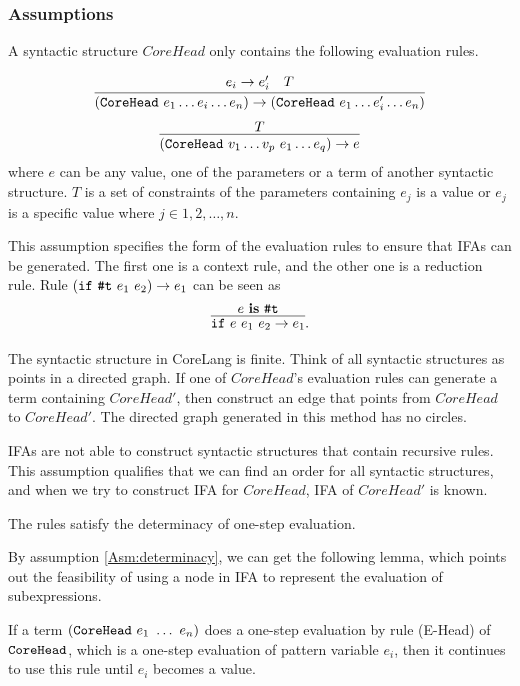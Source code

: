 \subsubsection{Assumptions}

\begin{Asm}
\label{Asm:rules}
A syntactic structure $CoreHead$ only contains the following evaluation rules.

\[
\infer
{(\m{CoreHead}~e_1 \ldots e_i \ldots e_n) \to (\m{CoreHead}~e_1 \ldots e_i' \ldots e_n)}{e_i \to e_i'\quad T}
\]
\[
\infer{(\m{CoreHead}~v_1 \ldots v_p~e_1 \ldots e_q) \to e}{T}
\]
where $e$ can be any value, one of the parameters or a term of another syntactic structure. $T$ is a set of constraints of the parameters containing $e_j$ is a value or $e_j$ is a specific value where $j \in 1,2,\ldots,n$.
\end{Asm}

This assumption specifies the form of the evaluation rules to ensure that IFAs can be generated. The first one is a context rule, and the other one is a reduction rule. Rule $(\mbox{\tt if}~\mbox{\tt \#t}~e_1~e_2) \to e_1$ can be seen as \[\infer{\m{if}~e~e_1~e_2 \to e_1}{e~\key{is}~\m{\#t}}.\]

\begin{Asm}
\label{Asm:orderliness}
The syntactic structure in CoreLang is finite. Think of all syntactic structures as points in a directed graph. If one of $CoreHead$'s evaluation rules can generate a term containing $CoreHead'$, then construct an edge that points from $CoreHead$ to $CoreHead'$. The directed graph generated in this method has no circles.
\end{Asm}

IFAs are not able to construct syntactic structures that contain recursive rules. This assumption qualifies that we can find an order for all syntactic structures, and when we try to construct IFA for $CoreHead$, IFA of $CoreHead'$ is known.

\begin{Asm}
\label{Asm:determinacy}
The rules satisfy the determinacy of one-step evaluation.
\end{Asm}

By assumption \ref{Asm:determinacy}, we can get the following lemma, which points out the feasibility of using a node in IFA to represent the evaluation of subexpressions.

\begin{lemma}
\label{lemma:one-step}
If a term $(\mbox{\tt CoreHead}~e_1~\ldots~e_n)$ does a one-step evaluation by rule (E-Head) of $\mbox{\tt CoreHead}$, which is a one-step evaluation of pattern variable $e_i$, then it continues to use this rule until $e_i$ becomes a value.
\end{lemma}

